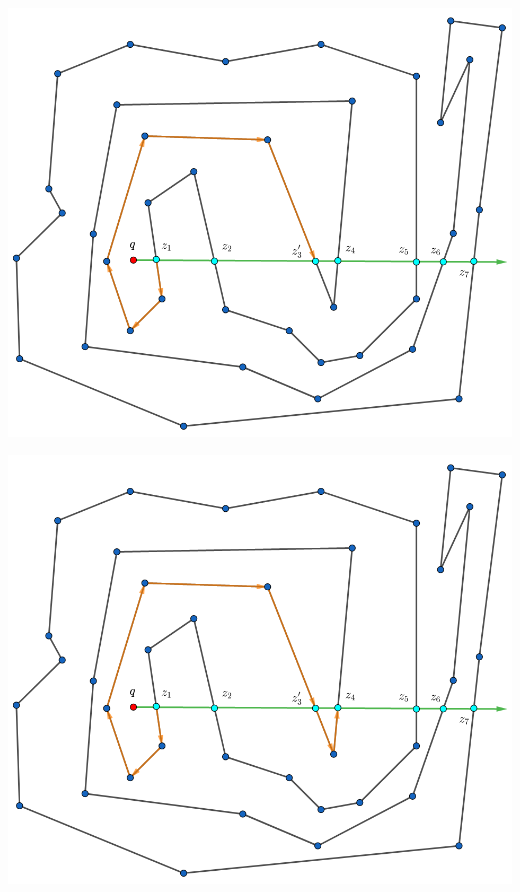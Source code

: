 \begin{frame}
  \centering \includegraphics[width=0.45 \paperwidth]{images/Poda/6.png}
\end{frame}

\begin{frame}
  \centering \includegraphics[width=0.45 \paperwidth]{images/Poda/7.png}
\end{frame}

